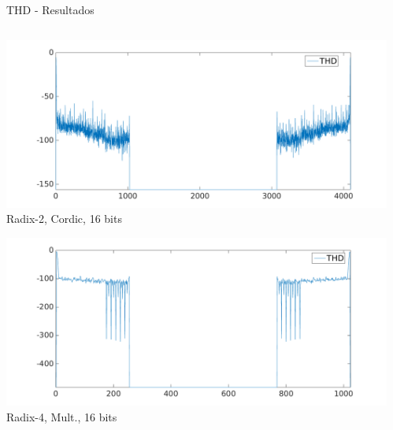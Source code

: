 \begin{frame}{THD - Resultados}
  \begin{columns}[T]
    \begin{column}{.5\textwidth}
        \begin{center}
	      \includegraphics[scale=0.17]{./figures/thd_r2_4096_16_cor.png}\\
          Radix-2, Cordic, 16 bits
        \end{center}
	    
	    
	    \begin{center}
	      \includegraphics[scale=0.17]{./figures/thd_r4_1024_16_mul.png}\\
	      Radix-4, Mult., 16 bits
	    \end{center}
	    
	    
    \end{column}
    
    \begin{column}{.5\textwidth}
	    

\end{column}
\end{columns}
\end{frame}
